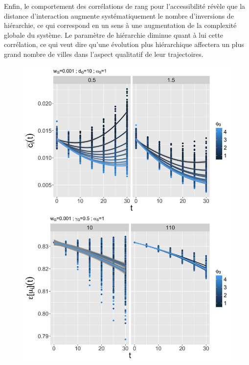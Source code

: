 Enfin, le comportement des corrélations de rang pour l'accessibilité révèle que la distance d'interaction augmente systématiquement le nombre d'inversions de hiérarchie, ce qui correspond en un sens à une augmentation de la complexité globale du système. Le paramètre de hiérarchie diminue quant à lui cette corrélation, ce qui veut dire qu'une évolution plus hiérarchique affectera un plus grand nombre de villes dans l'aspect qualitatif de leur trajectoires.



\begin{figure}
\includegraphics[width=\linewidth]{Figures/Final/6-2-2-fig-macrocoevol-behavior-time.jpg}

\end{figure}
